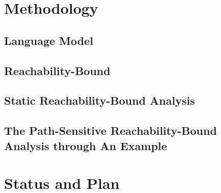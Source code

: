 \documentclass[a4paper,11pt]{article}
\begin{document}
\section{Methodology}
\label{sec:reachability-analysis}

\subsection{{Language Model}}
\label{sec:reachability-language}

\subsection{{Reachability-Bound}}
\label{sec:reachability-exe}

\subsection{{Static Reachability-Bound Analysis}}
\label{sec:reachability-static}


\subsection{The Path-Sensitive Reachability-Bound Analysis through An Example}
\label{sec:reachability-example}



% 

% 

\section{Status and Plan}
\label{sec:status-plan}




\end{document}
